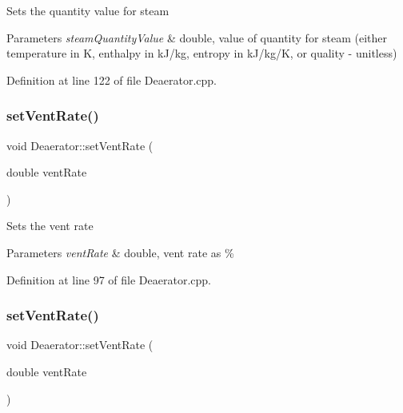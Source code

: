 Sets the quantity value for steam 
\begin{DoxyParams}{Parameters}
{\em steam\+Quantity\+Value} & double, value of quantity for steam (either temperature in K, enthalpy in k\+J/kg, entropy in k\+J/kg/K, or quality -\/ unitless) \\
\hline
\end{DoxyParams}


Definition at line 122 of file Deaerator.\+cpp.

\mbox{\label{class_deaerator_a11e71194f58763a57ec0f7d05a21782d}} 
\subsubsection{\texorpdfstring{set\+Vent\+Rate()}{setVentRate()}\hspace{0.1cm}{\footnotesize\ttfamily [1/3]}}
{\footnotesize\ttfamily void Deaerator\+::set\+Vent\+Rate (\begin{DoxyParamCaption}\item[{double}]{vent\+Rate }\end{DoxyParamCaption})}

Sets the vent rate 
\begin{DoxyParams}{Parameters}
{\em vent\+Rate} & double, vent rate as \% \\
\hline
\end{DoxyParams}


Definition at line 97 of file Deaerator.\+cpp.

\mbox{\label{class_deaerator_a11e71194f58763a57ec0f7d05a21782d}} 
\subsubsection{\texorpdfstring{set\+Vent\+Rate()}{setVentRate()}\hspace{0.1cm}{\footnotesize\ttfamily [2/3]}}
{\footnotesize\ttfamily void Deaerator\+::set\+Vent\+Rate (\begin{DoxyParamCaption}\item[{double}]{vent\+Rate }\end{DoxyParamCaption})}

